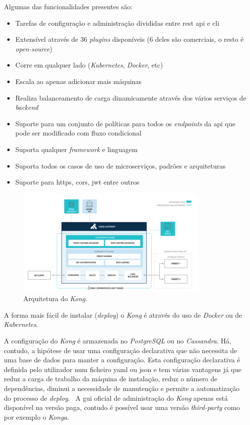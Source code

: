 Algumas das funcionalidades presentes são:~\cite{kong}
\begin{itemize}
    \item Tarefas de configuração e administração divididas entre \acrshort{rest} \acrshort{api} e \acrshort{cli}
    \item Extensível através de 36 \textit{plugins} disponíveis (6 deles são comerciais, o resto é \textit{open-source})
    \item Corre em qualquer lado (\textit{Kubernetes}, \textit{Docker}, etc)
    \item Escala ao apenas adicionar mais máquinas
    \item Realiza balanceamento de carga dinamicamente através dos vários serviços de \textit{backend}
    \item Suporte para um conjunto de políticas para todos os \textit{endpoints} da \acrshort{api} que pode ser modificado com fluxo condicional
    \item Suporta qualquer \textit{framework} e linguagem
    \item Suporta todos os casos de uso de microserviços, padrões e arquiteturas
    \item Suporte para \acrshort{https}, \acrshort{cors}, \acrshort{jwt} entre outros
\end{itemize}

\begin{figure}[H]
    \begin{center}
        \includegraphics[width=0.85\textwidth]{img/kongArch.png}
    \end{center}
    \caption{Arquitetura do \textit{Kong}.~\cite{kongArch}}
\end{figure}

A forma mais fácil de instalar (\textit{deploy}) o \textit{Kong} é através do uso de \textit{Docker} ou de \textit{Kubernetes}.

A configuração do \textit{Kong} é armazenada no \textit{PostgreSQL} ou no \textit{Cassandra}. Há, contudo, a hipótese de usar uma configuração declarativa que não necessita de uma base de dados para manter a configuração. Esta configuração declarativa é definida pelo utilizador num ficheiro \acrshort{yaml} ou \acrshort{json} e tem várias vantagens já que reduz a carga de trabalho da máquina de instalação, reduz o número de dependências, diminui a necessidade de manutenção e permite a automatização do processo de \textit{deploy}.~\cite{KongDBLess} A \acrshort{gui} oficial de administração do \textit{Kong} apenas está disponível na versão paga, contudo é possível usar uma versão \textit{third-party} como por exemplo o \textit{Konga}.

